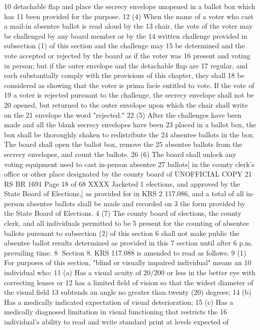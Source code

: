 10 detachable flap and place the secrecy envelope unopened in a ballot box which has
11 been provided for the purpose.
12 (4) When the name of a voter who cast a mail-in absentee ballot is read aloud by the
13 chair, the vote of the voter may be challenged by any board member or by the
14 written challenge provided in subsection (1) of this section and the challenge may
15 be determined and the vote accepted or rejected by the board as if the voter was
16 present and voting in person; but if the outer envelope and the detachable flap are
17 regular, and each substantially comply with the provisions of this chapter, they shall
18 be considered as showing that the voter is prima facie entitled to vote. If the vote of
19 a voter is rejected pursuant to the challenge, the secrecy envelope shall not be
20 opened, but returned to the outer envelope upon which the chair shall write on the
21 envelope the word "rejected."
22 (5) After the challenges have been made and all the blank secrecy envelopes have been
23 placed in a ballot box, the box shall be thoroughly shaken to redistribute the
24 absentee ballots in the box. The board shall open the ballot box, remove the
25 absentee ballots from the secrecy envelopes, and count the ballots.
26 (6) The board shall unlock any voting equipment used to cast in-person absentee
27 ballots[ in the county clerk's office or other place designated by the county board of 
UNOFFICIAL COPY 21 RS BR 1691
Page 18 of 68
XXXX Jacketed
1 elections, and approved by the State Board of Elections,] as provided for in KRS
2 117.086, and a total of all in-person absentee ballots shall be made and recorded on
3 the form provided by the State Board of Elections.
4 (7) The county board of elections, the county clerk, and all individuals permitted to be
5 present for the counting of absentee ballots pursuant to subsection (2) of this section
6 shall not make public the absentee ballot results determined as provided in this
7 section until after 6 p.m. prevailing time.
8 Section 8. KRS 117.088 is amended to read as follows:
9 (1) For purposes of this section, "blind or visually impaired individual" means an
10 individual who:
11 (a) Has a visual acuity of 20/200 or less in the better eye with correcting lenses or
12 has a limited field of vision so that the widest diameter of the visual field
13 subtends an angle no greater than twenty (20) degrees;
14 (b) Has a medically indicated expectation of visual deterioration;
15 (c) Has a medically diagnosed limitation in visual functioning that restricts the
16 individual's ability to read and write standard print at levels expected of
